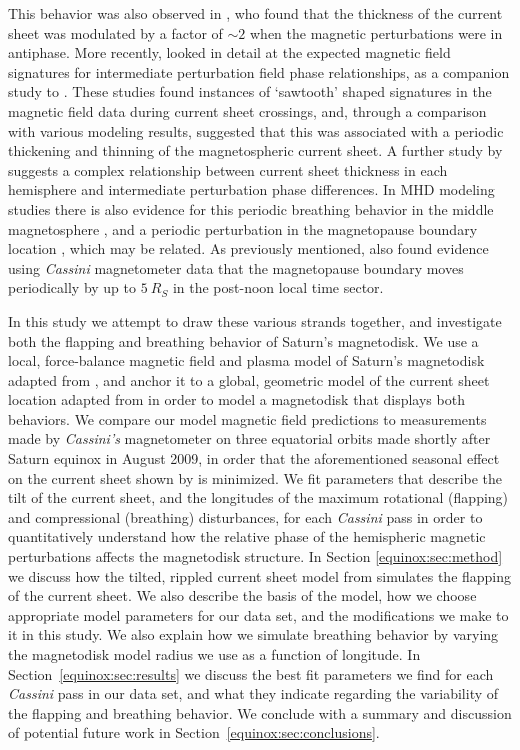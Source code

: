 This behavior was also observed in \citet{provan2012}, who found that the thickness of the current sheet was modulated by a factor of ${\sim}2$ when the magnetic perturbations were in antiphase. More recently, \citet{thomsen2017} looked in detail at the expected magnetic field signatures for intermediate perturbation field phase relationships, as a companion study to \citet{cowley2017a}. These studies found instances of `sawtooth' shaped signatures in the magnetic field data during current sheet crossings, and, through a comparison with various modeling results, suggested that this was associated with a periodic thickening and thinning of the magnetospheric current sheet. A further study by \citet{cowley2017b} suggests a complex relationship between current sheet thickness in each hemisphere and intermediate perturbation phase differences. In MHD modeling studies there is also evidence for this periodic breathing behavior in the middle magnetosphere \citep{ramer2016}, and a periodic perturbation in the magnetopause boundary location \citep{kivelson2014}, which may be related. As previously mentioned, \citet{clarke2010} also found evidence using \textit{Cassini} magnetometer data that the magnetopause boundary moves periodically by up to $\SI{5}{R_S}$ in the post-noon local time sector.

In this study we attempt to draw these various strands together, and investigate both the flapping and breathing behavior of Saturn's magnetodisk. We use a local, force-balance magnetic field and plasma model of Saturn's magnetodisk adapted from \citet{achilleos2010a}, and anchor it to a global, geometric model of the current sheet location adapted from \citet{arridge2011} in order to model a magnetodisk that displays both behaviors. We compare our model magnetic field predictions to measurements made by \textit{Cassini's} magnetometer on three equatorial orbits made shortly after Saturn equinox in August 2009, in order that the aforementioned seasonal effect on the current sheet shown by \citet{arridge2008warp} is minimized. We fit parameters that describe the tilt of the current sheet, and the longitudes of the maximum rotational (flapping) and compressional (breathing) disturbances, for each \textit{Cassini} pass in order to quantitatively understand how the relative phase of the hemispheric magnetic perturbations affects the magnetodisk structure. In Section \ref{equinox:sec:method} we discuss how the tilted, rippled current sheet model from \cite{arridge2011} simulates the flapping of the current sheet. We also describe the basis of the \citet{achilleos2010a} model, how we choose appropriate model parameters for our data set, and the modifications we make to it in this study. We also explain how we simulate breathing behavior by varying the magnetodisk model radius we use as a function of longitude. In Section~\ref{equinox:sec:results} we discuss the best fit parameters we find for each \textit{Cassini} pass in our data set, and what they indicate regarding the variability of the flapping and breathing behavior. We conclude with a summary and discussion of potential future work in Section~\ref{equinox:sec:conclusions}.

